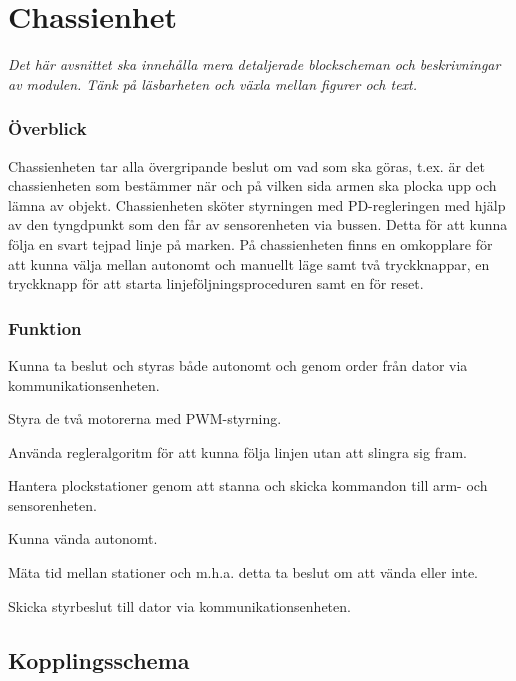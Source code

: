\section{Chassienhet}
\emph{Det här avsnittet ska innehålla mera detaljerade blockscheman och beskrivningar av modulen.
Tänk på läsbarheten och växla mellan figurer och text.}

\subsubsection{Överblick}
Chassienheten tar alla övergripande beslut om vad som ska göras, t.ex. är det chassienheten som bestämmer när och på vilken sida armen ska plocka upp och lämna av objekt. Chassienheten sköter styrningen med PD-regleringen med hjälp av den tyngdpunkt som den får av sensorenheten via bussen. Detta för att kunna följa en svart tejpad linje på marken. På chassienheten finns en omkopplare för att kunna välja mellan autonomt och manuellt läge samt två tryckknappar, en tryckknapp för att starta linjeföljningsproceduren samt en för reset. 

\subsubsection{Funktion}

\begin{packed_itemize}
\item Kunna ta beslut och styras både autonomt och genom order från dator via kommunikationsenheten.
\item Styra de två motorerna med PWM-styrning.
\item Använda regleralgoritm för att kunna följa linjen utan att slingra sig fram.
\item Hantera plockstationer genom att stanna och skicka kommandon till arm- och sensorenheten.
\item Kunna vända autonomt.
\item Mäta tid mellan stationer och m.h.a. detta ta beslut om att vända eller inte.
\item Skicka styrbeslut till dator via kommunikationsenheten.
\end{packed_itemize}

\subsection{Kopplingsschema}



